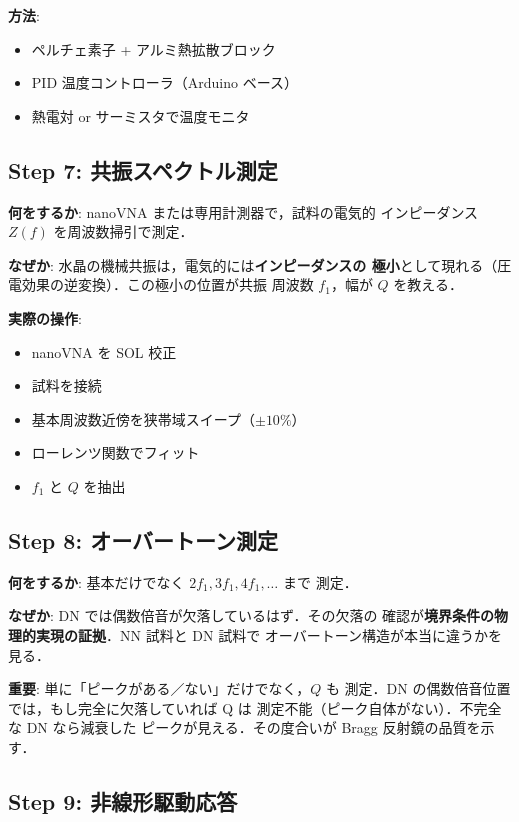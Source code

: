 \documentclass[11pt,a4paper]{article}
\begin{document}
\textbf{方法}:
\begin{itemize}
\item ペルチェ素子 + アルミ熱拡散ブロック
\item PID 温度コントローラ（Arduino ベース）
\item 熱電対 or サーミスタで温度モニタ
\end{itemize}

\subsection{Step 7: 共振スペクトル測定}

\textbf{何をするか}: nanoVNA または専用計測器で，試料の電気的
インピーダンス $Z(f)$ を周波数掃引で測定．

\textbf{なぜか}: 水晶の機械共振は，電気的には\textbf{インピーダンスの
極小}として現れる（圧電効果の逆変換）．この極小の位置が共振
周波数 $f_1$，幅が $Q$ を教える．

\textbf{実際の操作}:
\begin{itemize}
\item nanoVNA を SOL 校正
\item 試料を接続
\item 基本周波数近傍を狭帯域スイープ（$\pm 10\%$）
\item ローレンツ関数でフィット
\item $f_1$ と $Q$ を抽出
\end{itemize}

\subsection{Step 8: オーバートーン測定}

\textbf{何をするか}: 基本だけでなく $2f_1, 3f_1, 4f_1, \ldots$ まで
測定．

\textbf{なぜか}: DN では偶数倍音が欠落しているはず．その欠落の
確認が\textbf{境界条件の物理的実現の証拠}．NN 試料と DN 試料で
オーバートーン構造が本当に違うかを見る．

\textbf{重要}: 単に「ピークがある／ない」だけでなく，$Q$ も
測定．DN の偶数倍音位置では，もし完全に欠落していれば Q は
測定不能（ピーク自体がない）．不完全な DN なら減衰した
ピークが見える．その度合いが Bragg 反射鏡の品質を示す．

\subsection{Step 9: 非線形駆動応答}
\end{document}
